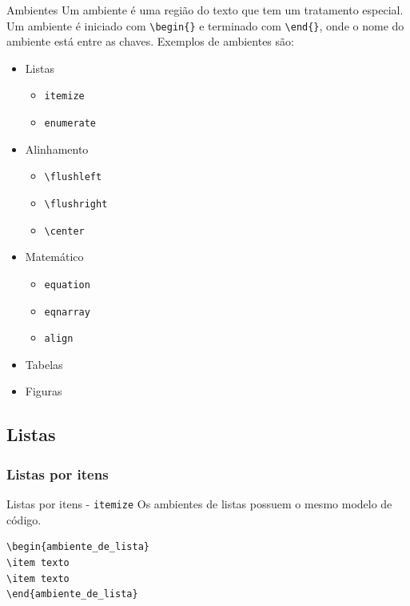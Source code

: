 \documentclass[c]{beamer}
\begin{document}
{\begin{frame}[fragile]{\sc Ambientes}
Um {\color{blue} ambiente} é uma região do texto que tem um tratamento especial.  
Um ambiente é {\color{blue} iniciado} com \verb|\begin{}| e {\color{blue} terminado} com 
\verb|\end{}|, onde o nome do ambiente está entre as chaves. {\color{blue} Exemplos} de ambientes são:
\begin{itemize}
	\setlength\itemsep{0.1cm}
	\item Listas
	\begin{itemize}
		\item \verb|itemize|
		\item \verb|enumerate|
	\end{itemize}
	\item Alinhamento
	\begin{itemize}
		\item \verb|\flushleft|
		\item \verb|\flushright|
		\item \verb|\center|
	\end{itemize}
	\item Matemático
	\begin{itemize}
		\item \verb|equation|
		\item \verb|eqnarray|
		\item \verb|align|
	\end{itemize}
	\item Tabelas
	\item Figuras
\end{itemize}
\end{frame}

\subsection{Listas}
\subsubsection{Listas por itens}

\begin{frame}[fragile]{\sc Listas por itens - \texttt{itemize}}
Os ambientes de {\color{blue} listas} possuem o mesmo modelo de código.
\begin{verbatim}
\begin{ambiente_de_lista}
\item texto
\item texto
\end{ambiente_de_lista}
\end{verbatim}
\end{frame}




}
\end{document}
